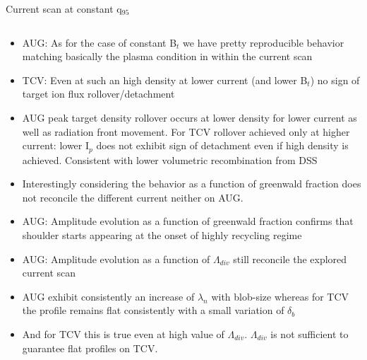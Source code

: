 \documentclass[10pt, compress]{beamer}
\begin{document}
\begin{frame}{Current scan at constant q$_{95}$}
\begin{columns}
\begin{column}{0.3\textwidth}
\begin{itemize}
        \item<2|only@2> AUG: As for the case of constant B$_t$ we have
          pretty reproducible behavior matching basically the plasma
          condition in within the current scan
        \item<3|only@3> TCV: Even at such an high density at lower
          current (and lower B$_t$) no sign of target ion flux
          rollover/detachment
        \item<4|only@4> AUG peak target density rollover
          occurs at lower density for lower current as well as
          radiation front movement. For TCV rollover achieved only at
          higher current: \alert{lower I$_p$ does not exhibit sign of
          detachment even if high density is
          achieved. Consistent with lower 
            volumetric recombination from DSS}
         \item<only@5> Interestingly considering the behavior as a
           function of greenwald fraction does not reconcile the
           different current neither on AUG.  
        \item<only@8> AUG: Amplitude evolution as a function of
          greenwald fraction confirms that shoulder starts appearing
          at the onset of highly recycling regime 
        \item<only@9> AUG: Amplitude evolution as a function of $\Lambda_{div}$ 
          still reconcile the explored current scan
        \item<only@10> AUG exhibit consistently an increase of
          $\lambda_n$ with blob-size whereas for TCV the profile
          remains flat consistently with a small variation of
          $\delta_b$
        \item<only@11> And for TCV this is true even at high value of
          $\Lambda_{div}$. \alert{$\Lambda_{div}$ is not sufficient to
          guarantee flat profiles on TCV.}
      \end{itemize}
    \end{column}
  \end{columns}
\end{frame}
\end{document}
